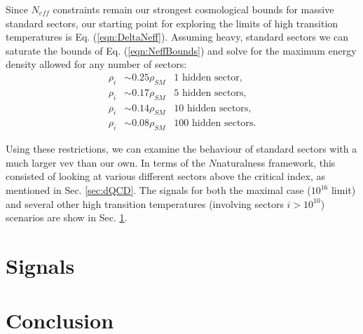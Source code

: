 \documentclass[nofootinbib,twocolumn,preprintnumbers]{revtex4-2}
\begin{document}
Since $N_{eff}$ constraints remain our strongest cosmological bounds for massive standard sectors, our starting point for exploring the limits of high transition temperatures is Eq. (\ref{eqn:DeltaNeff}). Assuming heavy, standard sectors we can saturate the bounds of Eq. (\ref{eqn:NeffBounds}) and solve for the maximum energy density allowed for any number of sectors:
\begin{equation}\label{eqn:energyDensityAllowed}
\begin{split}
\rho_i &\sim 0.25 \rho_{SM} \,\,\,\,\, \mathrm{1}\,\, \mathrm{hidden}\,\, \mathrm{sector},
\\
\rho_i &\sim 0.17 \rho_{SM} \,\,\,\,\, \mathrm{5} \,\,\mathrm{hidden}\,\, \mathrm{sectors},
\\
\rho_i &\sim 0.14 \rho_{SM} \,\,\,\,\, \mathrm{10} \,\,\mathrm{hidden}\,\, \mathrm{sectors},
\\
\rho_i &\sim 0.08 \rho_{SM} \,\,\,\,\, \mathrm{100} \,\,\mathrm{hidden}\,\, \mathrm{sectors}.
\end{split}
\end{equation}

Using these restrictions, we can examine the behaviour of standard sectors with a much larger vev than our own. In terms of the $N$naturalness framework, this consisted of looking at various different sectors above the critical index, as mentioned in Sec. \ref{sec:dQCD}. The signals for both the maximal case ($10^{16}$ limit) and several other high transition temperatures (involving sectors $i > 10^{10}$) scenarios are show in Sec. \ref{sec:signals}.

\section{Signals}
\label{sec:signals}

\section{Conclusion}
\label{sec:conclusion}


\appendix



\end{document}
